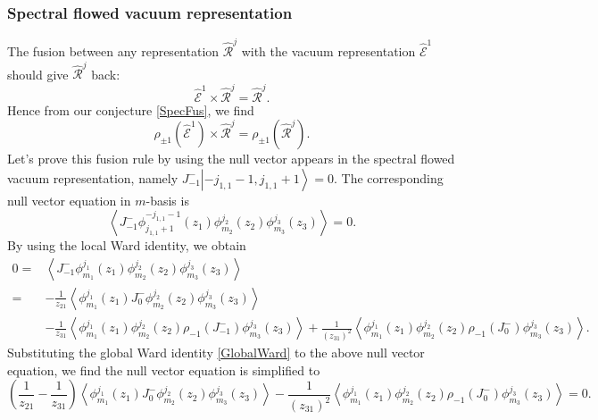 \documentclass[10pt,a4paper]{article}
\numberwithin{equation}{section}
\newcommand{\ket}[1]{\left| #1 \right\rangle}
\newcommand{\vev}[1]{\left\langle #1 \right\rangle}
\begin{document}
\subsubsection*{Spectral flowed vacuum representation}
The fusion between any representation $\hat{\mathcal{R}}^{j}$ with the vacuum representation $\widehat{\mathcal{E}}^{1}$ should give 
$\hat{\mathcal{R}}^{j}$ back: 
\begin{equation}
    \hat{\mathcal{E}}^{1} \times \hat{\mathcal{R}}^{j} = \hat{\mathcal{R}}^{j}.
\end{equation}
Hence from our conjecture \eqref{SpecFus}, we find 
\begin{equation}
    \rho_{\pm 1} \left( \hat{\mathcal{E}}^{1} \right) \times \hat{\mathcal{R}}^{j} = \rho_{\pm 1} \left( \hat{\mathcal{R}}^{j} \right).
\end{equation}
Let's prove this fusion rule by using the null vector appears in the spectral flowed vacuum representation, namely 
$J^{-}_{-1}\ket{-j_{1,1}-1,j_{1,1}+1}=0$. The corresponding null vector equation in $m$-basis is 
\begin{equation}
    \vev{J^{-}_{-1} \phi^{-j_{1,1}-1}_{j_{1,1}+1}(z_{1}) \phi^{j_{2}}_{m_{2}}(z_{2}) \phi^{j_{3}}_{m_{3}}(z_{3})} = 0.
\end{equation}
By using the local Ward identity, we obtain
\begin{equation}
    \begin{aligned}
        0 = &\vev{J^{-}_{-1} \phi^{j_{1}}_{m_{1}}(z_{1}) \phi^{j_{2}}_{m_{2}}(z_{2}) \phi^{j_{3}}_{m_{3}}(z_{3})} \\
        =& -\frac{1}{z_{21}} \vev{ \phi^{j_{1}}_{m_{1}}(z_{1}) J^{-}_{0} \phi^{j_{2}}_{m_{2}}(z_{2}) \phi^{j_{3}}_{m_{3}}(z_{3})} \\
        &- \frac{1}{z_{31}} \vev{ \phi^{j_{1}}_{m_{1}}(z_{1}) \phi^{j_{2}}_{m_{2}}(z_{2}) \rho_{-1}\left(J^{-}_{-1}\right) \phi^{j_{3}}_{m_{3}}(z_{3})} 
        + \frac{1}{(z_{31})^{2}} \vev{ \phi^{j_{1}}_{m_{1}}(z_{1}) \phi^{j_{2}}_{m_{2}}(z_{2}) \rho_{-1}\left(J^{-}_{0}\right) \phi^{j_{3}}_{m_{3}}(z_{3})}.
    \end{aligned}
\end{equation}
Substituting the global Ward identity \eqref{GlobalWard} to the above null vector equation, 
we find the null vector equation is simplified to 
\begin{equation}
    (\frac{1}{z_{21}}- \frac{1}{z_{31}}) \vev{ \phi^{j_{1}}_{m_{1}}(z_{1}) J^{-}_{0} \phi^{j_{2}}_{m_{2}}(z_{2}) \phi^{j_{3}}_{m_{3}}(z_{3})} - 
    \frac{1}{(z_{31})^{2}} \vev{ \phi^{j_{1}}_{m_{1}}(z_{1}) \phi^{j_{2}}_{m_{2}}(z_{2}) \rho_{-1}\left(J^{-}_{0}\right) \phi^{j_{3}}_{m_{3}}(z_{3})} = 0.
\end{equation}
\end{document}
